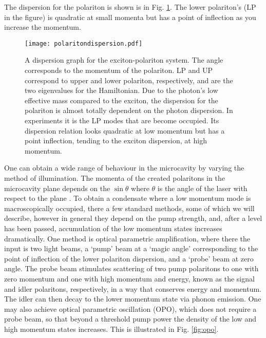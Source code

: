 \documentclass[letterpaper, 10 pt, conference]{IEEEtran}  %
\newcommand{\fig}[1]{Fig. #1}
\begin{document}
The dispersion for the polariton is shown is in \fig{\ref{fig:polaritondispersion}}. The lower polariton's (LP in the figure) is quadratic at small momenta but has a point of inflection as you increase the momentum\cite{doi:10.1080/00107514.2010.550120}. 

\begin{figure}[htbp!]
	\centering
	\texttt{[image: polaritondispersion.pdf]}
	\caption{A dispersion graph for the exciton-polariton system. The angle corresponds to the momentum of the polariton. LP and UP correspond to upper and lower polariton, respectively, and are the two eigenvalues for the Hamiltonian. Due to the photon's low effective mass compared to the exciton, the dispersion for the polariton is almost totally dependent on the photon dispersion. In experiments it is the LP modes that are become occupied. Its dispersion relation looks quadratic at low momentum but has a point inflection, tending to the exciton dispersion, at high momentum. \cite{doi:10.1080/00107514.2010.550120}}
	\label{fig:polaritondispersion}
\end{figure}

One can obtain a wide range of behaviour in the microcavity by varying the method of illumination. 
The momenta of the created polaritons in the microcavity plane depends on the $\sin \theta$ where $\theta$ is the angle of the laser with respect to the plane \cite{doi:10.1080/00107514.2010.550120}. 
To obtain a condensate where a low momentum mode is macroscopically occupied, there a few standard methods, some of which we will describe, however in general they depend on the pump strength, and, after a level has been passed, accumulation of the low momentum states increases dramatically.
One method is optical parametric amplification, where there the input is two light beams, a `pump' beam at a `magic angle' corresponding to the point of inflection of the lower polariton dispersion, and a `probe' beam at zero angle. 
The probe beam stimulates scattering of two pump polaritons to one with zero momentum and one with high momentum and energy, known as the signal and idler polaritons, respectively, in a way that conserves energy and momentum. 
The idler can then decay to the lower momentum state via phonon emission.
One may also achieve optical parametric oscillation (OPO), which does not require a probe beam, so that beyond a threshold pump power the density of the low and high momentum states increases.
This is illustrated in \fig{\ref{fig:opo}}.
\end{document}
